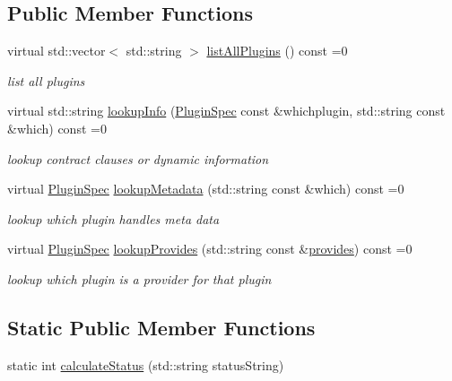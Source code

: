 \subsection*{Public Member Functions}
\begin{DoxyCompactItemize}
\item 
virtual std\+::vector$<$ std\+::string $>$ \hyperlink{classkdb_1_1tools_1_1PluginDatabase_adc1f43ccefdd7fc15a57db7571420642}{list\+All\+Plugins} () const =0
\begin{DoxyCompactList}\small\item\em list all plugins \end{DoxyCompactList}\item 
virtual std\+::string \hyperlink{classkdb_1_1tools_1_1PluginDatabase_ac0af2ec31a98f4176c19eaf34977abbe}{lookup\+Info} (\hyperlink{classkdb_1_1tools_1_1PluginSpec}{Plugin\+Spec} const \&whichplugin, std\+::string const \&which) const =0
\begin{DoxyCompactList}\small\item\em lookup contract clauses or dynamic information \end{DoxyCompactList}\item 
virtual \hyperlink{classkdb_1_1tools_1_1PluginSpec}{Plugin\+Spec} \hyperlink{classkdb_1_1tools_1_1PluginDatabase_a03a416f66d6525f46929e5a68d9db3f7}{lookup\+Metadata} (std\+::string const \&which) const =0
\begin{DoxyCompactList}\small\item\em lookup which plugin handles meta data \end{DoxyCompactList}\item 
virtual \hyperlink{classkdb_1_1tools_1_1PluginSpec}{Plugin\+Spec} \hyperlink{classkdb_1_1tools_1_1PluginDatabase_a43abe56a024218ecee48526ced699f05}{lookup\+Provides} (std\+::string const \&\hyperlink{classkdb_1_1tools_1_1PluginDatabase_afc91ff760616ee83c6afb70e5a2f0601a73ff10d6a07213c277db4326b3df6c4b}{provides}) const =0
\begin{DoxyCompactList}\small\item\em lookup which plugin is a provider for that plugin \end{DoxyCompactList}\end{DoxyCompactItemize}
\subsection*{Static Public Member Functions}
\begin{DoxyCompactItemize}
\item 
static int \hyperlink{classkdb_1_1tools_1_1PluginDatabase_ab901b98a6c7661bbccffa8ab9ff62dc6}{calculate\+Status} (std\+::string status\+String)
\end{DoxyCompactItemize}


